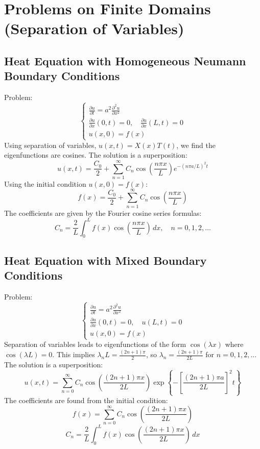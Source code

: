 \documentclass{article}
\begin{document}
	\section{Problems on Finite Domains (Separation of Variables)}
	
	\subsection{Heat Equation with Homogeneous Neumann Boundary Conditions}
	Problem:
	$$
	\begin{cases}
		\frac{\partial u}{\partial t} = a^2 \frac{\partial^2 u}{\partial x^2} \\
		\frac{\partial u}{\partial x}(0,t) = 0, \quad \frac{\partial u}{\partial x}(L,t) = 0 \\
		u(x,0) = f(x)
	\end{cases}
	$$
	Using separation of variables, $u(x,t) = X(x)T(t)$, we find the eigenfunctions are cosines. The solution is a superposition:
	$$
	u(x,t) = \frac{C_0}{2} + \sum_{n=1}^\infty C_n \cos\left(\frac{n\pi x}{L}\right) e^{-(n\pi a/L)^2 t}
	$$
	Using the initial condition $u(x,0) = f(x)$:
	$$
	f(x) = \frac{C_0}{2} + \sum_{n=1}^\infty C_n \cos\left(\frac{n\pi x}{L}\right)
	$$
	The coefficients are given by the Fourier cosine series formulas:
	$$
	C_n = \frac{2}{L} \int_0^L f(x) \cos\left(\frac{n\pi x}{L}\right) \,dx, \quad n=0, 1, 2, \dots
	$$
	
	\subsection{Heat Equation with Mixed Boundary Conditions}
	Problem:
	$$
	\begin{cases}
		\frac{\partial u}{\partial t} = a^2 \frac{\partial^2 u}{\partial x^2} \\
		\frac{\partial u}{\partial x}(0,t) = 0, \quad u(L,t) = 0 \\
		u(x,0) = f(x)
	\end{cases}
	$$
	Separation of variables leads to eigenfunctions of the form $\cos(\lambda x)$ where $\cos(\lambda L) = 0$.
	This implies $\lambda_n L = \frac{(2n+1)\pi}{2}$, so $\lambda_n = \frac{(2n+1)\pi}{2L}$ for $n=0, 1, 2, \dots$
	The solution is a superposition:
	$$
	u(x,t) = \sum_{n=0}^\infty C_n \cos\left(\frac{(2n+1)\pi x}{2L}\right) \exp\left\{-\left[\frac{(2n+1)\pi a}{2L}\right]^2 t\right\}
	$$
	The coefficients are found from the initial condition:
	$$
	f(x) = \sum_{n=0}^\infty C_n \cos\left(\frac{(2n+1)\pi x}{2L}\right)
	$$
	$$
	C_n = \frac{2}{L} \int_0^L f(x) \cos\left(\frac{(2n+1)\pi x}{2L}\right) \,dx
	$$
	
\end{document}
